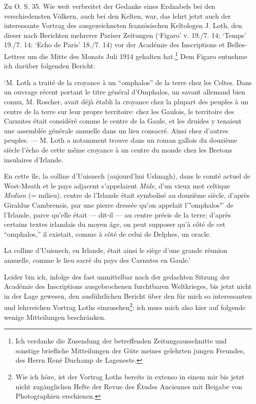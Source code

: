 \documentclass[a4paper, 11pt, oneside]{article}
\begin{document}
Zu O. S. 35. Wie weit verbreitet der Gedanke eines Erdnabels bei den verschiedensten Völkern, auch bei den Kelten, war, das lehrt jetzt auch der interessante Vortrag des ausgezeichneten französischen Keltologen J. Loth, den dieser nach Berichten mehrerer Pariser Zeitungen (`Figaro' v. 19./7. 14; `Temps' 19./7. 14; `Echo de Paris' 18./7. 14) vor der Académie des Inscriptions et Belles-Lettres um die Mitte des Monats Juli 1914 gehalten hat.\footnote{Ich verdanke die Zusendung der betreffenden Zeitungsausschnitte und sonstige briefliche Mitteilungen der Güte meines gelehrten jungen Freundes, des Herrn René Duchamp de Lageneste.} Dem Figaro entnehme ich darüber folgenden Bericht:

`M. Loth a traité de la croyance à un "`omphalos"' de la terre chez les Celtes. Dans un ouvrage récent portant le titre général d'Omphalos, un savant allemand bien connu, M. Roscher, avait déjà établi la croyance chez la plupart des peuples à un centre de la terre sur leur propre territoire: chez les Gaulois, le territoire des Carnutes était considéré comme le centre de la Gaule, et les druides y tenaient une assemblée générale annuelle dans un lieu consacré. Ainsi chez d'autres peuples. --- M. Loth a notamment trouve dans un roman gallois du douzième siècle l'écho de cette même croyance à un centre du monde chez les Bretons insulaires d'Irlande.

En cette île, la colline d'Uuisnech (aujourd'hui Ushnagh), dans le comté actuel de West-Meath et le pays adjacent s'appelaient \emph{Mide}, d'un vieux mot celtique \emph{Medion} (= milieu). centre de l'Irlande était symbolisé au douzième siècle, d'après Giraldus Cambrensis, par une pierre dressée qu'on appelait l'"omphalos"' de l'Irlande, parce qu'elle était --- dit-il --- au centre précis de la terre; d'après certains textes irlandais du moyen âge, on peut supposer qu'à côté de cet "`omphalos,"' il existait, comme à côté de celui de Delphes, un oracle.

La colline d'Uuisnech, en Irlande, était ainsi le siège d'une grande réunion annuelle, comme le lieu sacré du pays des Carnutes en Gaule.'

Leider bin ich, infolge des fast unmittelbar nach der gedachten Sitzung der Académie des Inscriptions ausgebrochenen furchtbaren Weltkrieges, bis jetzt nicht in der Lage gewesen, den ausführlichen Bericht über den für mich so interessanten und lehrreichen Vortrag Loths einzusehen\footnote{Wie ich höre, ist der Vortrag Loths bereits in extenso in einem mir bis jetzt nicht zugänglichen Hefte der Revue des Études Anciennes mit Beigabe von Photographien erschienen.}: ich muss mich also hier auf folgende wenige Mitteilungen beschränken.
\end{document}
